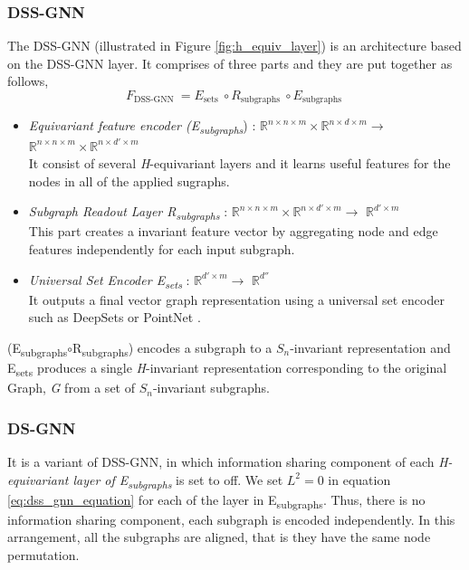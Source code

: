 \documentclass[11pt, dvipsnames, DIV=12]{scrreprt}
\theoremstyle{definition}
\begin{document}
\subsubsection{DSS-GNN}
The DSS-GNN (illustrated in Figure \ref{fig:h_equiv_layer}) is an architecture based on the DSS-GNN layer. It comprises of three parts and they are put together as follows,
\begin{equation} \label{eq:dss_gnn_equation}
        F_{\text {DSS-GNN }}=E_{\text {sets }} \circ R_{\text {subgraphs }} \circ E_{\text {subgraphs }}
\end{equation}
\begin{itemize}
    \item \emph{Equivariant feature encoder (E\textsubscript{subgraphs}}) : $\mathbb{R}^{n \times n \times m} \times \mathbb{R}^{n \times d \times m} \rightarrow$ $\mathbb{R}^{n \times n \times m} \times \mathbb{R}^{n \times d' \times m} $ \\
    It consist of several \textit{H}-equivariant layers and it learns useful features for the nodes in all of the applied sugraphs.
    \item \emph{Subgraph Readout Layer R\textsubscript{subgraphs}} : $\mathbb{R}^{n \times n \times m} \times \mathbb{R}^{n \times d' \times m} \rightarrow$ $\mathbb{R}^{d' \times m} $ \\
    This part creates a invariant feature vector by aggregating node  and edge features independently for each input subgraph.
    \item \emph{Universal Set Encoder E\textsubscript{sets}} : $\mathbb{R}^{d' \times m} \rightarrow$ $\mathbb{R}^{d''} $ \\
    It outputs a final vector graph representation using a universal set encoder such as DeepSets \citep{zaheer_deepsets_2017} or PointNet \citep{qi_pointnet_2017}.
\end{itemize}
(E\textsubscript{subgraphs}$\circ$R\textsubscript{subgraphs}) encodes a subgraph to a \textit{$S_n$}-invariant representation and E\textsubscript{sets} produces a single \textit{H}-invariant representation corresponding to the original Graph, \textit{G} from a set of \textit{$S_n$}-invariant subgraphs.


\subsubsection{DS-GNN}
It is a variant of DSS-GNN, in which information sharing component of each  \emph{H-equivariant layer of E\textsubscript{subgraphs}} is set to off. We set \textit{$L^2=0$} in equation \ref{eq:dss_gnn_equation} for each of the layer in E\textsubscript{subgraphs}. Thus, there is no information sharing component, each subgraph is encoded independently. In this arrangement, all the subgraphs are aligned, that is they have the same node permutation.
\end{document}
